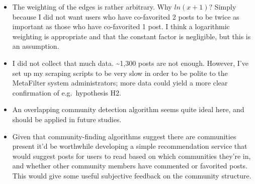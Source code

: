 \begin{itemize}
\item
  The weighting of the edges is rather arbitrary. Why $ln(x+1)$? Simply
  because I did not want users who have co-favorited 2 posts to be twice
  as important as those who have co-favorited 1 post. I think a
  logarithmic weighting is appropriate and that the constant factor is
  negligible, but this is an assumption.
\item
  I did not collect that much data. \textasciitilde{}1,300 posts are not
  enough. However, I've set up my scraping scripts to be very slow in
  order to be polite to the MetaFilter system administrators; more data
  could yield a more clear confirmation of e.g.~hypothesis H2.
\item
  An overlapping community detection algorithm seems quite ideal here,
  and should be applied in future studies.
\item
  Given that community-finding algorithms suggest there are communities
  present it'd be worthwhile developing a simple recommendation service
  that would suggest posts for users to read based on which communities
  they're in, and whether other community members have commented or
  favorited posts. This would give some useful subjective feedback on
  the community structure.
\end{itemize}

